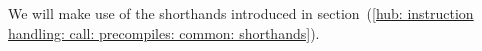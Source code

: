 We will make use of the shorthands introduced in section~(\ref{hub: instruction handling: call: precompiles: common: shorthands}).
